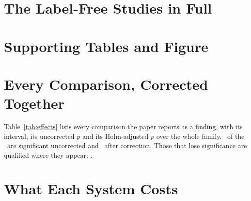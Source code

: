 \documentclass[11pt]{article}
\begin{document}



\appendix

\section{The Label-Free Studies in Full}
\label{app:labelfree}



\section{Supporting Tables and Figure}
\label{app:supporting}














\section{Every Comparison, Corrected Together}
\label{app:effects}

Table~\ref{tab:effects} lists every comparison the paper reports as a finding,
with its interval, its uncorrected $p$ and its Holm-adjusted $p$ over the whole
family. \EffectNominal\ of the \EffectTests\ are significant uncorrected and
\EffectHolm\ after correction. Those that lose significance are qualified where
they appear: \EffectLostList.



\section{What Each System Costs}
\label{app:cost}
\end{document}
